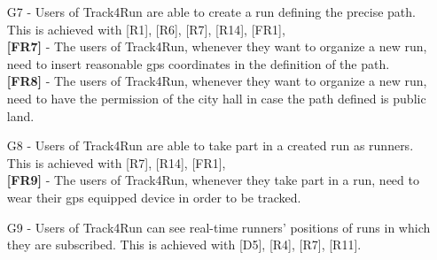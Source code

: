 \begin{itemize}
\item [G7] - Users of Track4Run are able to create a run defining the precise path.
This is achieved with [R1], [R6], [R7], [R14], [FR1], \\
\textbf{[FR7]} - The users of Track4Run, whenever they want to organize a new run, need to insert reasonable gps coordinates in the definition of the path. \\
\textbf{[FR8]} - The users of Track4Run, whenever they want to organize a new run, need to have the permission of the city hall in case the path defined is public land.
\item [G8] - Users of Track4Run are able to take part in a created run as runners.
This is achieved with [R7], [R14], [FR1], \\
\textbf{[FR9]} - The users of Track4Run, whenever they take part in a run, need to wear their gps equipped device in order to be tracked.
\item [G9] - Users of Track4Run can see real-time runners' positions of runs in which they are subscribed.
This is achieved with [D5], [R4], [R7], [R11].
\end{itemize}

